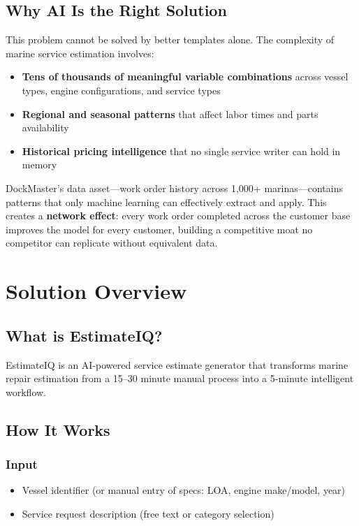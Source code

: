 \documentclass[11pt,a4paper]{article}
\begin{document}
\subsection{Why AI Is the Right Solution}

This problem cannot be solved by better templates alone. The complexity of marine service estimation involves:

\begin{itemize}[leftmargin=*]
    \item \textbf{Tens of thousands of meaningful variable combinations} across vessel types, engine configurations, and service types
    \item \textbf{Regional and seasonal patterns} that affect labor times and parts availability
    \item \textbf{Historical pricing intelligence} that no single service writer can hold in memory
\end{itemize}

DockMaster's data asset---work order history across 1,000+ marinas---contains patterns that only machine learning can effectively extract and apply. This creates a \textbf{network effect}: every work order completed across the customer base improves the model for every customer, building a competitive moat no competitor can replicate without equivalent data.

\newpage
\section{Solution Overview}

\subsection{What is EstimateIQ?}

EstimateIQ is an AI-powered service estimate generator that transforms marine repair estimation from a 15--30 minute manual process into a 5-minute intelligent workflow.

\subsection{How It Works}

\subsubsection*{Input}
\begin{itemize}[leftmargin=*]
    \item Vessel identifier (or manual entry of specs: LOA, engine make/model, year)
    \item Service request description (free text or category selection)
\end{itemize}
\end{document}
